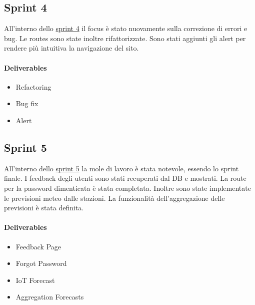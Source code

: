 \subsection{Sprint 4}
All'interno dello  \href{https://github.com/orgs/Weather-Vortex/projects/6}{sprint 4} il focus è stato nuovamente sulla correzione di errori e bug. Le routes sono state inoltre rifattorizzate. Sono stati aggiunti gli alert per rendere più intuitiva la navigazione del sito. 
\paragraph{Deliverables} 
\begin{itemize}
    \item Refactoring 
    \item Bug fix
    \item Alert
\end{itemize}

\subsection{Sprint 5}
All'interno dello  \href{https://github.com/orgs/Weather-Vortex/projects/7}{sprint 5} la mole di lavoro è stata notevole, essendo lo sprint finale. I feedback degli utenti sono stati recuperati dal DB e mostrati. La route per la password dimenticata è stata completata.
Inoltre sono state implementate le previsioni meteo dalle stazioni. La funzionalità dell'aggregazione delle previsioni è stata definita. 
\paragraph{Deliverables} 
\begin{itemize}
    \item Feedback Page 
    \item Forgot Password
    \item IoT Forecast
    \item Aggregation Forecasts
\end{itemize}

